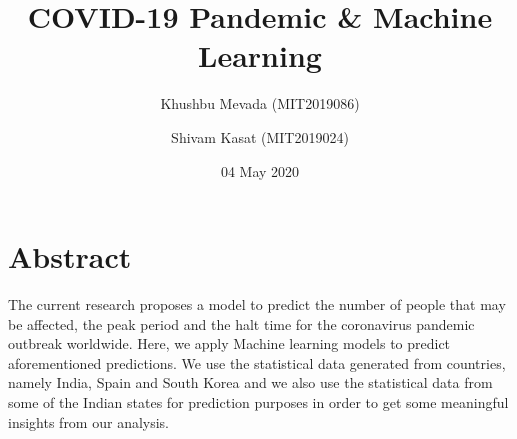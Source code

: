 \documentclass{article}
\title{COVID-19 Pandemic \& Machine Learning}
\author{Khushbu Mevada (MIT2019086) \and Shivam Kasat (MIT2019024) }
\date{04 May 2020}
\begin{document}
\maketitle
\section*{Abstract}
The current research proposes a model to predict the number of people that may be affected, the peak period and the halt time for the coronavirus pandemic outbreak worldwide. Here, we apply Machine learning models to predict aforementioned predictions. We use the statistical data generated from countries, namely India, Spain and South Korea and we also use the statistical data from some of the Indian states for prediction purposes in order to get some meaningful insights from our analysis. 
\end{document}

